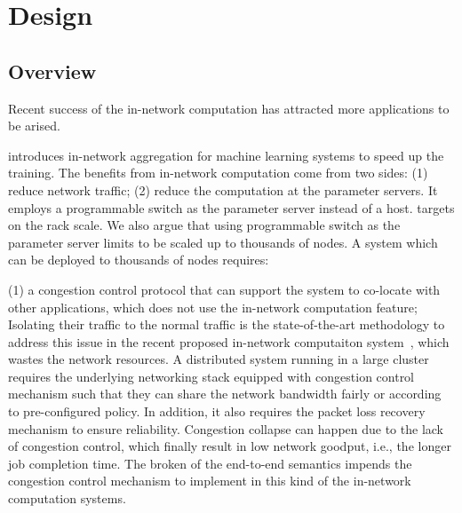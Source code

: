 \section{Design}
\subsection{Overview}


Recent success of the in-network computation has attracted more 
applications to be arised.  

\switchml introduces in-network aggregation for machine learning systems
to speed up the training. The benefits from in-network computation 
come from two sides: (1) reduce network traffic; (2) reduce the computation
at the parameter servers. 
It employs a programmable switch as the parameter server instead of a host. 
\switchml targets on the rack scale. We also argue that using programmable switch
as the parameter server limits \switchml to be scaled up to 
thousands of nodes. A system which can be deployed to thousands of nodes requires:


(1) a congestion control protocol that can support the system to
co-locate with other applications, which does not use the in-network computation feature;
Isolating their traffic to the normal traffic is the state-of-the-art methodology to 
address this issue in the recent proposed in-network computaiton system~\cite{netcache, netchain, harmonia, switchml}, which wastes the network resources. 
A distributed system running in a large cluster requires the underlying networking stack equipped with 
congestion control mechanism such that they can share the network
bandwidth fairly or according to pre-configured policy.
In addition, it also requires the packet loss recovery mechanism to ensure 
reliability. Congestion collapse can happen due to the lack of congestion control, 
which finally result in low network goodput, i.e., the longer job completion time. 
The broken of the end-to-end semantics impends the congestion control mechanism to implement
in this kind of the in-network computation systems. 


